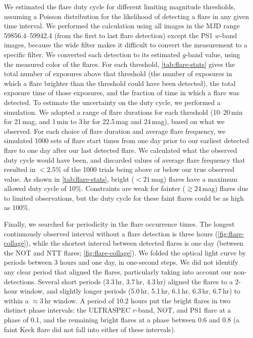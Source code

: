 \documentclass{nature_plusfigure}
\begin{document}
\begin{methods}
We estimated the flare duty cycle for different limiting magnitude thresholds, assuming a Poisson distribution for the likelihood of detecting a flare in any given time interval.
We performed the calculation using all images in the MJD range 59856.4--59942.4 (from the first to last flare detection) except the PS1 $w$-band images, because the wide filter makes it difficult to convert the measurement to a specific filter.
We converted each detection to its estimated $g$-band value, using the measured color of the flares.
For each threshold, \ref{tab:flare-stats} gives the total number of exposures above that threshold (the number of exposures in which a flare brighter than the threshold could have been detected), the total exposure time of those exposures, and the fraction of time in which a flare was detected. To estimate the uncertainty on the duty cycle, we performed a simulation. We adopted a range of flare durations for each threshold (10--20\,min for 21\,mag, and 1\,min to 3\,hr for 22.5\,mag and 24\,mag), based on what we observed. For each choice of flare duration and average flare frequency, we simulated 1000 sets of flare start times from one day prior to our earliest detected flare to one day after our last detected flare. We calculated what the observed duty cycle would have been, and discarded values of average flare frequency that resulted in $<2.5\%$ of the 1000 trials being above or below our true observed value.  As shown in \ref{tab:flare-stats}, bright ($<21$\,mag) flares have a maximum allowed duty cycle of 10\%. Constraints are weak for fainter ($\gtrsim24$\,mag) flares due to limited observations, but the duty cycle for these faint flares could be as high as 100\%.  

Finally, we searched for periodicity in the flare occurrence times. The longest continuously observed interval without a flare detection is three hours (\ref{fig:flare-collage}), while the shortest interval between detected flares is one day (between the NOT and NTT flares; \ref{fig:flare-collage}). We folded the optical light curve by periods between 3 hours and one day, in one-second steps.
We did not identify any clear period that aligned the flares, particularly taking into account our non-detections.
Several short periods (3.3\,hr, 3.7\,hr, 4.3\,hr) aligned the flares to a 2-hour window, and slightly longer periods (5.0\,hr, 5.1\,hr, 6.1\,hr, 6.3\,hr, 6.7\,hr) to within a $\approx3$\,hr window.
A period of 10.2 hours put the bright flares in two distinct phase intervals: the ULTRASPEC $r$-band, NOT, and PS1 flare at a phase of 0.1, and the remaining bright flares at a phase between 0.6 and 0.8 (a faint Keck flare did not fall into either of these intervals).  


\end{methods}
\end{document}
